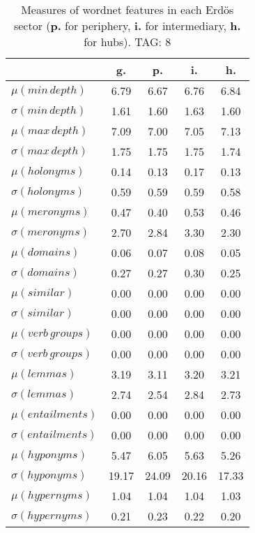 \begin{table}[h!]
\begin{center}
\begin{tabular}{| l || c | c | c | c |}\hline
 & {\bf g.} & {\bf p.} & {\bf i.} & {\bf h.} \\\hline\hline
$\mu(min\,depth)$ & 6.79  & 6.67  & 6.76  & 6.84 \\
$\sigma(min\,depth)$ & 1.61  & 1.60  & 1.63  & 1.60 \\\hline
$\mu(max\,depth)$ & 7.09  & 7.00  & 7.05  & 7.13 \\
$\sigma(max\,depth)$ & 1.75  & 1.75  & 1.75  & 1.74 \\\hline
$\mu(holonyms)$ & 0.14  & 0.13  & 0.17  & 0.13 \\
$\sigma(holonyms)$ & 0.59  & 0.59  & 0.59  & 0.58 \\\hline
$\mu(meronyms)$ & 0.47  & 0.40  & 0.53  & 0.46 \\
$\sigma(meronyms)$ & 2.70  & 2.84  & 3.30  & 2.30 \\\hline
$\mu(domains)$ & 0.06  & 0.07  & 0.08  & 0.05 \\
$\sigma(domains)$ & 0.27  & 0.27  & 0.30  & 0.25 \\\hline
$\mu(similar)$ & 0.00  & 0.00  & 0.00  & 0.00 \\
$\sigma(similar)$ & 0.00  & 0.00  & 0.00  & 0.00 \\\hline
$\mu(verb\,groups)$ & 0.00  & 0.00  & 0.00  & 0.00 \\
$\sigma(verb\,groups)$ & 0.00  & 0.00  & 0.00  & 0.00 \\\hline
$\mu(lemmas)$ & 3.19  & 3.11  & 3.20  & 3.21 \\
$\sigma(lemmas)$ & 2.74  & 2.54  & 2.84  & 2.73 \\\hline
$\mu(entailments)$ & 0.00  & 0.00  & 0.00  & 0.00 \\
$\sigma(entailments)$ & 0.00  & 0.00  & 0.00  & 0.00 \\\hline
$\mu(hyponyms)$ & 5.47  & 6.05  & 5.63  & 5.26 \\
$\sigma(hyponyms)$ & 19.17  & 24.09  & 20.16  & 17.33 \\\hline
$\mu(hypernyms)$ & 1.04  & 1.04  & 1.04  & 1.03 \\
$\sigma(hypernyms)$ & 0.21  & 0.23  & 0.22  & 0.20 \\\hline
\end{tabular}
\caption{Measures of wordnet features in each Erd\"os sector ({{\bf p.}} for periphery, {{\bf i.}} for intermediary, {{\bf h.}} for hubs). TAG: 8}
\end{center}
\end{table}